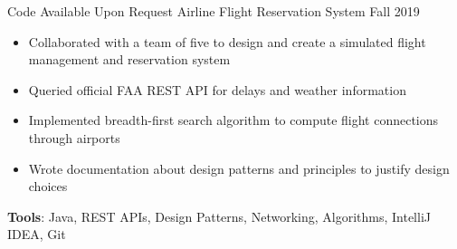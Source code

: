 \documentclass{awesome-cv}
\begin{document}
\begin{cventries}
			\vspace{0.05cm}
			\cventryB
				{Code Available Upon Request}
				{Airline Flight Reservation System\small{\textnormal{\color{graytext}{\enskip Engineering of Software Subsystems}}}}
				{Fall 2019}
				{}
				{
					\vspace{-0.25cm}
					\begin{itemize}[nosep]
						\item Collaborated with a team of five to design and create a simulated flight management and reservation system
						\item Queried official FAA REST API for delays and weather information
						\item Implemented breadth-first search algorithm to compute flight connections through airports
						\item Wrote documentation about design patterns and principles to justify design choices
					\end{itemize}
					\vspace{0.2cm}
					\qquad \textbf{Tools}: Java, REST APIs, Design Patterns, Networking, Algorithms, IntelliJ IDEA, Git
				}


		
		\end{cventries}
\end{document}
